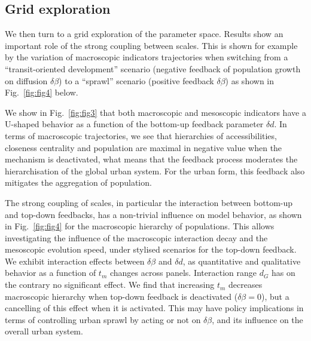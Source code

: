 \documentclass[11pt]{article}
\begin{document}
\subsection{Grid exploration}




We then turn to a grid exploration of the parameter space. %
Results show an important role of the strong coupling between scales. This is shown for example by the variation of macroscopic indicators trajectories when switching from a ``transit-oriented development'' scenario (negative feedback of population growth on diffusion $\delta \beta$) to a ``sprawl'' scenario (positive feedback $\delta \beta$) as shown in Fig.~\ref{fig:fig4} below.



We show in Fig.~\ref{fig:fig3} that both macroscopic and mesoscopic indicators have a U-shaped behavior as a function of the bottom-up feedback parameter $\delta d$. In terms of macroscopic trajectories, we see that hierarchies of accessibilities, closeness centrality and population are maximal in negative value when the mechanism is deactivated, what means that the feedback process moderates the hierarchisation of the global urban system. For the urban form, this feedback also mitigates the aggregation of population.





The strong coupling of scales, in particular the interaction between bottom-up and top-down feedbacks, has a non-trivial influence on model behavior, as shown in Fig.~\ref{fig:fig4} for the macroscopic hierarchy of populations. This allows investigating the influence of the macroscopic interaction decay and the mesoscopic evolution speed, under stylised scenarios for the top-down feedback. We exhibit interaction effects between $\delta \beta$ and $\delta d$, as quantitative and qualitative behavior as a function of $t_m$ changes across panels. Interaction range $d_G$ has on the contrary no significant effect. We find that increasing $t_m$ decreases macroscopic hierarchy when top-down feedback is deactivated ($\delta \beta=0$), but a cancelling of this effect when it is activated. This may have policy implications in terms of controlling urban sprawl by acting or not on $\delta \beta$, and its influence on the overall urban system.
\end{document}
